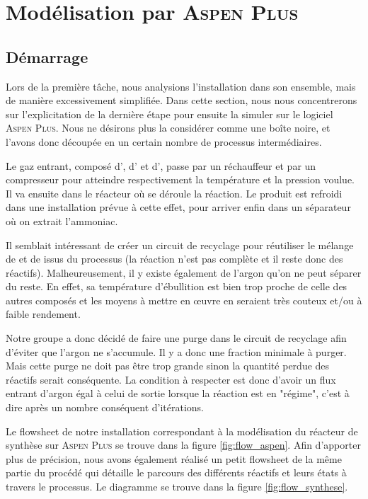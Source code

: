 \section{Modélisation par \textsc{Aspen Plus}}
\subsection{Démarrage}

Lors de la première tâche, nous analysions l'installation dans son ensemble, 
mais de manière excessivement simplifiée. 
Dans cette section, nous nous concentrerons sur l'explicitation de la dernière étape 
pour ensuite la simuler sur le logiciel \textsc{Aspen Plus}. 
Nous ne désirons plus la considérer comme une boîte noire, et l'avons donc découpée 
en un certain nombre de processus intermédiaires. 

Le gaz entrant, composé d', d' et d', passe par un réchauffeur 
et par un compresseur pour atteindre respectivement la température et la pression voulue. 
Il va ensuite dans le réacteur où se déroule la réaction.
Le produit est refroidi dans une installation prévue à cette effet, 
pour arriver enfin dans un séparateur où on extrait l'ammoniac.

Il semblait intéressant de créer un circuit de recyclage pour réutiliser 
le mélange de  et de  issus du processus (la réaction n'est pas complète 
et il reste donc des réactifs). Malheureusement, il y existe également de l'argon 
qu'on ne peut séparer du reste. En effet, sa température d'ébullition est bien trop 
proche de celle des autres composés et les moyens à mettre en œuvre en seraient 
très couteux et/ou à faible rendement.

Notre groupe a donc décidé de faire une purge dans le circuit de recyclage
afin d'éviter que l'argon ne s'accumule. 
Il y a donc une fraction minimale à purger. 
Mais cette purge ne doit pas être trop grande sinon la quantité perdue 
des réactifs serait conséquente. 
La condition à respecter est donc d'avoir un flux entrant d'argon égal à celui de sortie 
lorsque la réaction est en "régime", c'est à dire après un nombre conséquent d'itérations.

Le flowsheet de notre installation correspondant à la modélisation 
du réacteur de synthèse sur \textsc{Aspen Plus} 
se trouve dans la figure \ref{fig:flow_aspen}.
Afin d'apporter plus de précision, nous avons également réalisé un petit 
flowsheet de la même partie du procédé qui détaille le parcours des 
différents réactifs et leurs états à travers le processus.
Le diagramme se trouve dans la figure \ref{fig:flow_synthese}.

